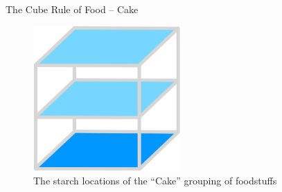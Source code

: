 \documentclass{beamer}
\begin{document}
\begin{frame}{The Cube Rule of Food -- Cake}
    \begin{figure}
        \includegraphics[width=0.5\textwidth]{images/cube_rule_of_food/cake/32_cake.png}
        \caption{\label{fig:cake-diagram}The starch locations of the ``Cake'' grouping of foodstuffs}
    \end{figure}
\end{frame}
\end{document}
